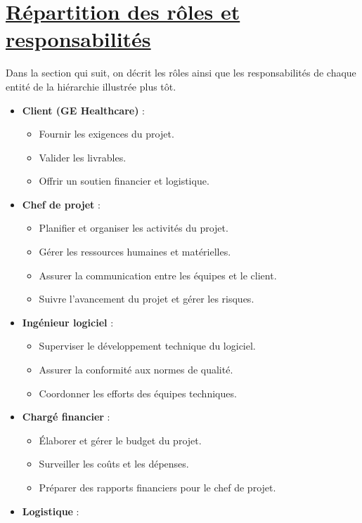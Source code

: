 \documentclass[11pt]{article}
\begin{document}
\newpage

\section{\underline{Répartition des rôles et responsabilités}}
Dans la section qui suit, on décrit les rôles ainsi que les responsabilités de chaque entité de la hiérarchie illustrée plus tôt.

\begin{itemize}
  \item \textbf{Client (GE Healthcare)} :
    \begin{itemize}
      \item Fournir les exigences du projet.
      \item Valider les livrables.
      \item Offrir un soutien financier et logistique.
    \end{itemize}
  \item \textbf{Chef de projet} :
    \begin{itemize}
      \item Planifier et organiser les activités du projet.
      \item Gérer les ressources humaines et matérielles.
      \item Assurer la communication entre les équipes et le client.
      \item Suivre l'avancement du projet et gérer les risques.
    \end{itemize}
  \item \textbf{Ingénieur logiciel} :
    \begin{itemize}
      \item Superviser le développement technique du logiciel.
      \item Assurer la conformité aux normes de qualité.
      \item Coordonner les efforts des équipes techniques.
    \end{itemize}
  \item \textbf{Chargé financier} :
    \begin{itemize}
      \item Élaborer et gérer le budget du projet.
      \item Surveiller les coûts et les dépenses.
      \item Préparer des rapports financiers pour le chef de projet.
    \end{itemize}
  \item \textbf{Logistique} :

\end{itemize}
\end{document}
